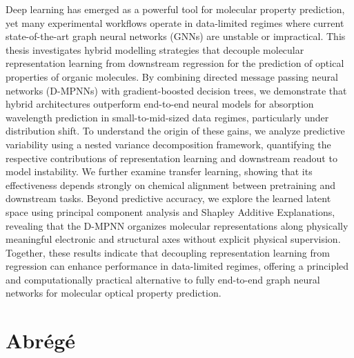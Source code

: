 \documentclass[12pt]{report}
\begin{document}
Deep learning has emerged as a powerful tool for molecular property prediction, yet many experimental workflows operate in data-limited regimes where current state-of-the-art graph neural networks (GNNs) are unstable or impractical. This thesis investigates hybrid modelling strategies that decouple molecular representation learning from downstream regression for the prediction of optical properties of organic molecules. By combining directed message passing neural networks (D-MPNNs) with gradient-boosted decision trees, we demonstrate that hybrid architectures outperform end-to-end neural models for absorption wavelength prediction in small-to-mid-sized data regimes, particularly under distribution shift. To understand the origin of these gains, we analyze predictive variability using a nested variance decomposition framework, quantifying the respective contributions of representation learning and downstream readout to model instability. We further examine transfer learning, showing that its effectiveness depends strongly on chemical alignment between pretraining and downstream tasks. Beyond predictive accuracy, we explore the learned latent space using principal component analysis and Shapley Additive Explanations, revealing that the D-MPNN organizes molecular representations along physically meaningful electronic and structural axes without explicit physical supervision. Together, these results indicate that decoupling representation learning from regression can enhance performance in data-limited regimes, offering a principled and computationally practical alternative to fully end-to-end graph neural networks for molecular optical property prediction.

\chapter*{Abrégé}
\label{sec:frAbstract}
\end{document}

